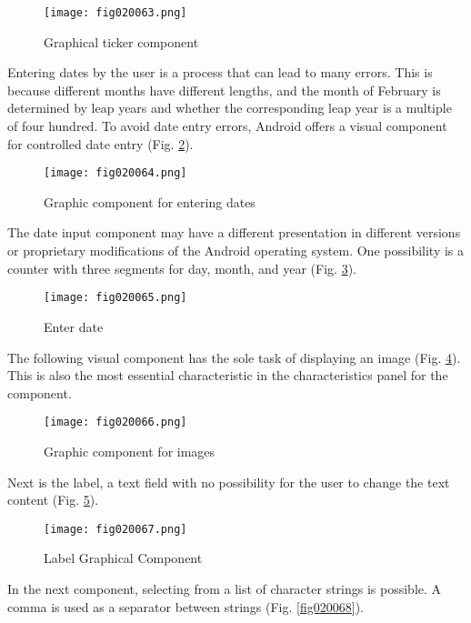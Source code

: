 \begin{figure}[H]
   \centering
   \texttt{[image: fig020063.png]}
   \caption{Graphical ticker component}
\label{fig020063}
\end{figure}

Entering dates by the user is a process that can lead to many errors. This is because different months have different lengths, and the month of February is determined by leap years and whether the corresponding leap year is a multiple of four hundred. To avoid date entry errors, Android offers a visual component for controlled date entry (Fig. \ref{fig020064}).

\begin{figure}[H]
   \centering
   \texttt{[image: fig020064.png]}
   \caption{Graphic component for entering dates}
\label{fig020064}
\end{figure}

The date input component may have a different presentation in different versions or proprietary modifications of the Android operating system. One possibility is a counter with three segments for day, month, and year (Fig. \ref{fig020065}).

\begin{figure}[H]
   \centering
   \texttt{[image: fig020065.png]}
   \caption{Enter date}
\label{fig020065}
\end{figure}

The following visual component has the sole task of displaying an image (Fig. \ref{fig020066}). This is also the most essential characteristic in the characteristics panel for the component.

\begin{figure}[H]
   \centering
   \texttt{[image: fig020066.png]}
   \caption{Graphic component for images}
\label{fig020066}
\end{figure}

Next is the label, a text field with no possibility for the user to change the text content (Fig. \ref{fig020067}).

\begin{figure}[H]
   \centering
   \texttt{[image: fig020067.png]}
   \caption{Label Graphical Component}
\label{fig020067}
\end{figure}

In the next component, selecting from a list of character strings is possible. A comma is used as a separator between strings (Fig. \ref{fig020068}).

